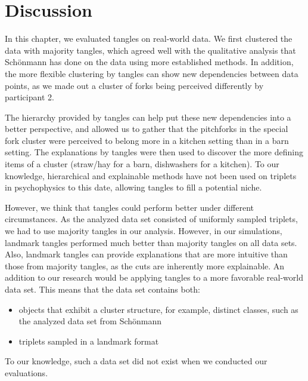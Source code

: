 \FloatBarrier
\section{Discussion}
In this chapter, we evaluated tangles on real-world data.  
We first clustered the data with majority tangles, which agreed well with the qualitative analysis that Schönmann has done on the data using more established methods. 
In addition, the more flexible clustering by tangles can show new dependencies between data points, as we 
made out a cluster of forks being perceived differently by participant 2. 

The hierarchy provided by tangles can help put these new dependencies into a better perspective, 
and allowed us to gather that the pitchforks in the special fork cluster were perceived to 
belong more in a kitchen setting than in a barn setting.
The explanations by tangles were then used to discover the more defining items of a cluster (straw/hay for
a barn, dishwashers for a kitchen).  To our knowledge, hierarchical and explainable methods
have not been used on triplets in psychophysics to this date, allowing tangles to fill a potential niche.

However, we think that tangles could perform better under different circumstances.
As the analyzed data set consisted of uniformly sampled triplets, we had to use majority tangles in our analysis.
However, in our simulations, landmark tangles performed much better than majority tangles on all data sets.
Also, landmark tangles can provide explanations that are more intuitive than those from majority tangles,
as the cuts are inherently more explainable. 
An addition to our research would be applying tangles to a more favorable real-world data set. This means that the data set contains both:
\begin{itemize}
    \item objects that exhibit a cluster structure, for example, distinct classes, such as the analyzed data set from Schönmann
    \item triplets sampled in a landmark format
\end{itemize}
To our knowledge, such a data set did not exist when we conducted our evaluations.

